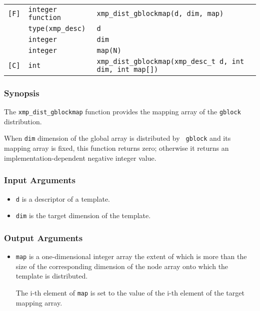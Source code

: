 \begin{tabular}{lll}

\verb![F]!& {\tt integer function}& {\tt xmp\_dist\_gblockmap(d, dim, map)}\\
          & {\tt type(xmp\_desc)} & {\tt d}\\
          & {\tt integer} & {\tt dim}\\
          & {\tt integer} & {\tt map(N)}\\

\verb![C]!&  {\tt int}& {\tt xmp\_dist\_gblockmap(xmp\_desc\_t d, int dim, int map[])}\\

\end{tabular}

\subsubsection*{Synopsis}

The {\tt xmp\_dist\_gblockmap} function provides the mapping array of the
{\tt gblock} distribution.

When {\tt dim} dimension of the global array is distributed by {\tt
gblock} and its mapping array is fixed, this function returns zero;
otherwise it returns an implementation-dependent negative integer value.

\subsubsection*{Input Arguments}
\begin{itemize}
 \item {\tt d} is a descriptor of a template.
 \item {\tt dim} is the target dimension of the template.
\end{itemize}

\subsubsection*{Output Arguments}
\begin{itemize}
 \item {\tt map} is a one-dimensional integer array the extent of which
       is more than the size of the corresponding
       dimension of the node array onto which the template is
       distributed.

       The i-th element of {\tt map} is set to the value of the i-th
       element of the target mapping array.
\end{itemize}


